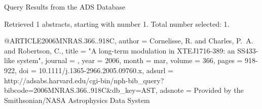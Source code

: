 Query Results from the ADS Database


Retrieved 1 abstracts, starting with number 1.  Total number selected: 1.

@ARTICLE{2006MNRAS.366..918C,
   author = {{Cornelisse}, R. and {Charles}, P.~A. and {Robertson}, C.},
    title = "{A long-term modulation in XTEJ1716-389: an SS433-like system}",
  journal = {\mnras},
     year = 2006,
    month = mar,
   volume = 366,
    pages = {918-922},
      doi = {10.1111/j.1365-2966.2005.09760.x},
   adsurl = {http://adsabs.harvard.edu/cgi-bin/nph-bib_query?bibcode=2006MNRAS.366..918C&db_key=AST},
  adsnote = {Provided by the Smithsonian/NASA Astrophysics Data System}
}



